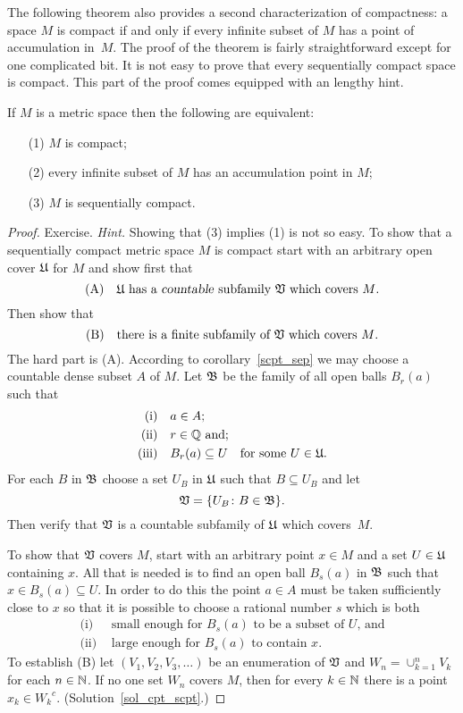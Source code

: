 The following theorem also provides a second characterization of compactness: a space $M$ is
compact if and only if every infinite subset of $M$ has a point of accumulation in~$M$. The
proof of the theorem is fairly straightforward except for one complicated bit. It is not easy
to prove that every sequentially compact space is compact. This part of the proof comes
equipped with an lengthy hint.

\begin{thm}\label{cpt_scpt} If $M$ is a metric space then the following are equivalent:
 \begin{enumerate}
  \item[(1)] $M$ is compact;
  \item[(2)] every infinite subset of $M$ has an accumulation point in $M$;
  \item[(3)] $M$ is sequentially compact.
 \end{enumerate}
\end{thm}

\begin{proof} Exercise. \emph{Hint.} Showing that (3) implies (1) is not so easy.  To
show that a sequentially compact metric space $M$ is compact start with an arbitrary open
cover $\mathfrak{U}$ for $M$ and show first that
  \[ \text{(A)\quad $\mathfrak{U}$ has a {\sl countable\/} subfamily $\mathfrak{V}$ which covers $M$.} \]
Then show that
  \[ \text{(B)\quad there is a finite subfamily of $\mathfrak{V}$ which covers $M$.} \]
The hard part is (A).  According to corollary~\ref{scpt_sep} we may choose a countable
dense subset $A$ of $M$. Let $\mathfrak{B}$ be the family of all open balls $B_r(a)$ such that
 \begin{align*}
       \text{(i)\quad} &a \in A;\\
      \text{(ii)\quad} &r \in \mathbb{Q} \text{ and;}\\
     \text{(iii)\quad} &B_r(a) \subseteq U \text{\quad for some }U \in \mathfrak{U}.
 \end{align*}
For each $B$ in $\mathfrak{B}$ choose a set $U_B$ in $\mathfrak{U}$ such that $B \subseteq U_B$ and
let
   \[ \mathfrak{V} = \{U_B \colon B \in \mathfrak{B}\}. \]
Then verify that $\mathfrak{V}$ is a countable subfamily of $\mathfrak{U}$ which covers~$M$.

To show that $\mathfrak{V}$ covers $M$, start with an arbitrary point $x \in M$ and a set $U
\in \mathfrak{U}$ containing $x$.  All that is needed is to find an open ball $B_s(a)$ in
$\mathfrak{B}$ such that $x \in B_s(a) \subseteq U$. In order to do this the point $a \in A$
must be taken sufficiently close to $x$ so that it is possible to choose a rational
number $s$ which is both
 \begin{align*}
      \text{(i) } &\text{ small enough for $B_s(a)$ to be a subset of~$U$, and} \\
      \text{(ii)} &\text{ large enough for $B_s(a)$ to contain $x$.}
 \end{align*}
To establish (B) let $(V_1, V_2, V_3, \dots)$ be an enumeration of $\mathfrak{V}$ and $W_n =
\cup_{k=1}^n V_k$ for each $n \in \mathbb{N}$. If no one set $W_n$ covers $M$, then for every $k
\in \mathbb{N}$ there is a point $x_k \in {W_k}^c$.    (Solution~\ref{sol_cpt_scpt}.)  \ns
\end{proof}

